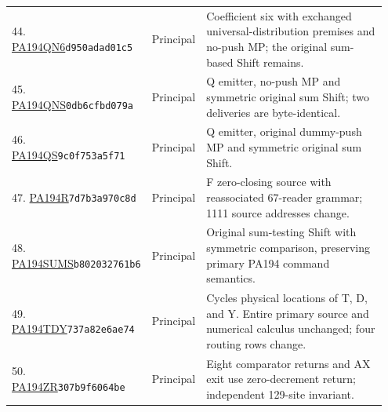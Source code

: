 \begin{longtable}{@{}p{0.27\linewidth}p{0.13\linewidth}p{0.55\linewidth}@{}}
44. \href{https://github.com/VladimirReshetnikov/ProveIt/blob/32d0d8b7d93a63ad4106c18cdb29b37927acdad2/Computability/BusyBeaver/Research/PA/docs/pa194qn6_conpa_2026-11-14/machine/machine.tm}{PA194QN6}\newline\texttt{d950adad01c5} & Principal & Coefficient six with exchanged universal-distribution premises and no-push MP; the original sum-based Shift remains.\\[5pt]
45. \href{https://github.com/VladimirReshetnikov/ProveIt/blob/32d0d8b7d93a63ad4106c18cdb29b37927acdad2/Computability/BusyBeaver/Research/PA/docs/pa194qns_research_2026-11-13/machines/PA194QNS/machine.tm}{PA194QNS}\newline\texttt{0db6cfbd079a} & Principal & Q emitter, no-push MP and symmetric original sum Shift; two deliveries are byte-identical.\\[5pt]
46. \href{https://github.com/VladimirReshetnikov/ProveIt/blob/32d0d8b7d93a63ad4106c18cdb29b37927acdad2/Computability/BusyBeaver/Research/PA/docs/pa194qns_research_2026-11-13/machines/PA194QS/machine.tm}{PA194QS}\newline\texttt{9c0f753a5f71} & Principal & Q emitter, original dummy-push MP and symmetric original sum Shift.\\[5pt]
47. \href{https://github.com/VladimirReshetnikov/ProveIt/blob/32d0d8b7d93a63ad4106c18cdb29b37927acdad2/Computability/BusyBeaver/Research/PA/docs/PA194R_research_2026-11-14/machines/PA194R/machine.tm}{PA194R}\newline\texttt{7d7b3a970c8d} & Principal & F zero-closing source with reassociated 67-reader grammar; 1111 source addresses change.\\[5pt]
48. \href{https://github.com/VladimirReshetnikov/ProveIt/blob/32d0d8b7d93a63ad4106c18cdb29b37927acdad2/Computability/BusyBeaver/Research/PA/docs/PA194NS_research/pa194sums.tm}{PA194SUMS}\newline\texttt{b802032761b6} & Principal & Original sum-testing Shift with symmetric comparison, preserving primary PA194 command semantics.\\[5pt]
49. \href{https://github.com/VladimirReshetnikov/ProveIt/blob/32d0d8b7d93a63ad4106c18cdb29b37927acdad2/Computability/BusyBeaver/Research/PA/docs/pa194_tdy_2026-11-14/artifacts/pa194_tdy.tm}{PA194TDY}\newline\texttt{737a82e6ae74} & Principal & Cycles physical locations of T, D, and Y. Entire primary source and numerical calculus unchanged; four routing rows change.\\[5pt]
50. \href{https://github.com/VladimirReshetnikov/ProveIt/blob/32d0d8b7d93a63ad4106c18cdb29b37927acdad2/Computability/BusyBeaver/Research/PA/docs/pa194zr_conpa_2026-11-13/machine/pa194zr.tm}{PA194ZR}\newline\texttt{307b9f6064be} & Principal & Eight comparator returns and AX exit use zero-decrement return; independent 129-site invariant.\\[5pt]

\end{longtable}
